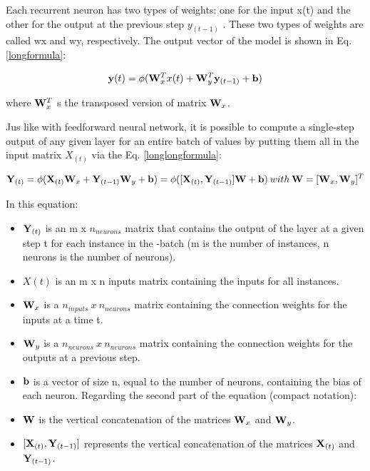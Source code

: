 Each recurrent neuron has two types of weights: one for the input x(t) and the other for the output at the previous step $y_{(t-1)}$ . These two types of weights are called wx and wy, respectively. The output vector of the model is shown in Eq. \eqref{longformula}:

\begin{equation} 
   {\bf y }(t) = {\bf \phi}({\bf W}_{x}^{T} x (t) +{\bf W} _{y} ^{T} {\bf y} _{(t-1)} + {\bf b}) 
    \label{longformula}
\end{equation}

where ${\bf W}_x^T$  s the transposed version of matrix ${\bf W}_x$.

Jus like with feedforward neural network, it is possible to compute a single-step output of any given layer for  an entire batch of values by putting them all in the input matrix $X_{(t)}$ via the Eq. \eqref{longlongformula}:

\begin{equation} 
   {\bf Y} _{(t)} = {\bf \phi}({\bf X}_{(t)} {\bf W} _x + {\bf Y} _{(t-1)}{\bf W}_y + {\bf b}) = {\bf \phi}([{\bf X }_{(t)} , {\bf Y}_{(t-1)} ] {\bf W}  + {\bf b}) \: with \: {\bf W} = [{\bf W}_x ,{\bf W}_y ]^T
    \label{longlongformula}
\end{equation}

In this equation: 

\begin{itemize}
    \item ${\bf Y}_{(t)}$ is an m x $n_{neurons}$ matrix that contains the output of the layer at a given step t for each instance in the -batch (m is the number of instances, n neurons is the number of neurons).
    \item $X (t)$ is an m x n inputs matrix containing the inputs for all instances.
    \item ${\bf W}_x$ is a  $n_{inputs} \:x\: n_{neurons}$ matrix containing the connection weights for the inputs at a time t.
    \item ${\bf W}_y $ is a $n_{neurons} \:x\: n_ {neurons}$ matrix  containing the connection weights for the outputs at a previous step.
    \item ${\bf b}$ is a vector of size n, equal to the number of neurons, containing the bias of each neuron.
    Regarding the second part of the equation (compact notation):
     \item ${\bf W}$ is the vertical concatenation of the matrices ${\bf W}_x$ and ${\bf W}_y$.
    \item $[{\bf X}_{(t)}, {\bf Y}_{(t-1)}]$ represents the vertical concatenation of the matrices ${\bf X}_{(t)}$ and ${\bf Y}_{(t-1)}$.
\end{itemize}

